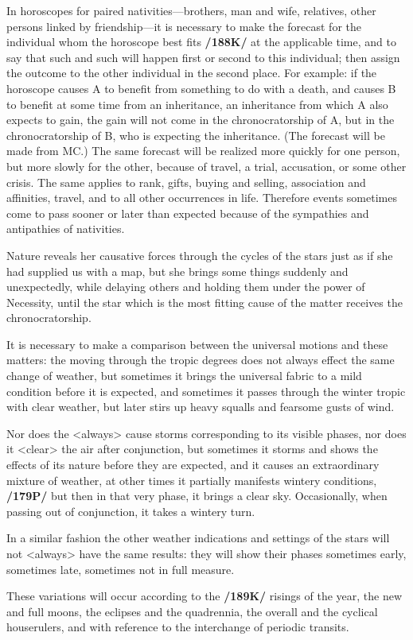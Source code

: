 In horoscopes for paired nativities—brothers, man and wife, relatives, other persons linked by friendship—it is necessary to make the forecast for the individual whom the horoscope best fits \textbf{/188K/} at the applicable time, and to say that such and such will happen first or second to this individual; then assign the outcome to the other individual in the second place. For example: if the horoscope causes A to benefit from something to do with a death, and causes B to benefit at some time from an inheritance, an inheritance from which A also expects to gain, the gain will not come in the chronocratorship of A, but in the chronocratorship of B, who is expecting the inheritance. (The forecast will be made from MC.) The
same forecast will be realized more quickly for one person, but more slowly for the other, because of travel, a trial, accusation, or some other crisis. The same applies to rank, gifts, buying and selling, association and affinities, travel, and to all other occurrences in life. Therefore events sometimes come to pass sooner or later than expected because of the sympathies and antipathies of nativities. 

Nature reveals her causative forces through the cycles of the stars just as if she had supplied us with a map, but she brings some things suddenly and unexpectedly, while delaying others and holding them under the power of Necessity, until the
star which is the most fitting cause of the matter receives the chronocratorship.

It is necessary to make a comparison between the universal motions and these matters: the \Sun\xspace moving through the tropic degrees does not always effect the same change of weather, but sometimes it brings the universal fabric to a mild condition before it is expected, and sometimes it passes through the winter tropic with clear weather, but later stirs up heavy squalls and fearsome gusts of wind. 

Nor does the \Moon <always> cause storms corresponding to its visible phases, nor does it <clear> the air after conjunction, but sometimes it storms and shows the effects of its nature before they are expected, and it causes an
extraordinary mixture of weather, at other times it partially manifests wintery conditions, \textbf{/179P/} but then
in that very phase, it brings a clear sky. Occasionally, when passing out of conjunction, it takes a wintery turn. 

In a similar fashion the other weather indications and settings of the stars will not <always> have the same results: they will show their phases sometimes early, sometimes late, sometimes not in full measure.

These variations will occur according to the \textbf{/189K/} risings of the year, the new and full moons, the eclipses and the quadrennia, the overall and the cyclical houserulers, and with reference to the interchange of periodic transits.

\newpage